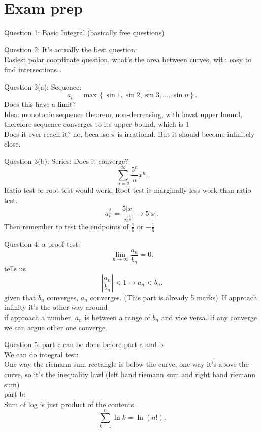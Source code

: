 \section{Exam prep}
\begin{example}
	Question 1: Basic Integral (basically free questions)
\end{example}
\begin{example}
	Question 2: It's actually the best question:\\
	Easiest polar coordinate question, what's the area between curves, with easy to find intersections\ldots
\end{example}
\begin{example}
	Question 3(a): Sequence:
	\[
		a_n = \mathrm{max}\,\left\{ \sin 1, \sin 2, \sin 3, \ldots, \sin n \right\} 
	.\] 
	Does this have a limit?\\
	Idea: monotonic sequence theorem, non-decreasing, with lowst upper bound, therefore sequence converges to its upper bound, which is 1\\
	Does it ever reach it? no, because $\pi$ is irrational. But it should become infinitely close.
\end{example}
\begin{example}
	Question 3(b): Series: Does it converge?
	\[
	\sum_{n=2}^{\infty} \frac{5^n}{n}x^n
	.\] 
	Ratio test or root test would work. Root test is marginally less work than ratio test.
	\[
	a_n^{\frac{1}{n}} = \frac{5 \left| x \right| }{n^{\frac{1}{n}}} \to 5\left| x \right| 
	.\] 
	Then remember to test the endpoints of $\frac{1}{5}$ or $-\frac{1}{5}$
\end{example}
\begin{example}
	Question 4: a proof test:
	\[
	\lim_{n \to \infty} \frac{a_n}{b_n} = 0
	.\] 
	tells us 
	\[
	\left| \frac{a_n}{b_n} \right| < 1\to a_n < b_n
	.\] 
	given that $b_n$ converges, $a_n$ converges. (This part is already 5 marks)\
	If approach infinity it's the other way around\\
	if approach a number, $a_n$ is between a range of  $b_n$ and vice versa. If any converge we can argue other one converge.
\end{example}
\begin{example}
	Question 5: part c can be done before part a and b\\
	We can do integral test:\\
	One way the riemann sum rectangle is below the curve, one way it's above the curve, so it's the inequality lawl (left hand riemann sum and right hand riemann sum)\\
	part b:\\
	Sum of log is just product of the contents.
	\[
	\sum_{k=1}^{n} \ln k = \ln (n!)
	.\] 
\end{example}

